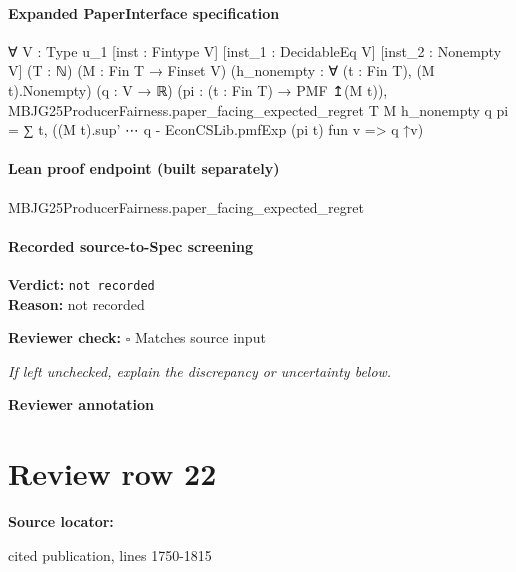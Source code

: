\documentclass[10pt]{article}
\newcommand{\reviewerbox}{%
  \par\noindent\fbox{\parbox{0.96\linewidth}{\rule{0pt}{0.38in}}}\par
}
\newcommand{\reviewmatch}[1]{%
  \par\noindent\textbf{Reviewer check:} $\square$\; #1\par
  \noindent\emph{If left unchecked, explain the discrepancy or uncertainty below.}\par
}
\begin{document}
\paragraph{Expanded PaperInterface specification}
\begin{ReviewVerbatim}
∀ {V : Type u_1} [inst : Fintype V] [inst_1 : DecidableEq V] [inst_2 : Nonempty V] (T : ℕ) (M : Fin T → Finset V)
  (h_nonempty : ∀ (t : Fin T), (M t).Nonempty) (q : V → ℝ) (pi : (t : Fin T) → PMF ↥(M t)),
  MBJG25ProducerFairness.paper_facing_expected_regret T M h_nonempty q pi =
    ∑ t, ((M t).sup' ⋯ q - EconCSLib.pmfExp (pi t) fun v => q ↑v)
\end{ReviewVerbatim}

\paragraph{Lean proof endpoint (built separately)}\begin{ReviewVerbatim}
MBJG25ProducerFairness.paper_facing_expected_regret
\end{ReviewVerbatim}

\paragraph{Recorded source-to-Spec screening}
\textbf{Verdict:} \texttt{not recorded}
\\
\textbf{Reason:} not recorded
\reviewmatch{Matches source input}
\noindent\textbf{Reviewer annotation}\par
\reviewerbox
\clearpage
\hypertarget{source-claim-7a7d1cda2bb14e73}{}
\section*{Review row 22}
\textbf{Source locator:} {\footnotesize\raggedright cited publication, lines 1750-\allowbreak{}1815\par}
\end{document}
